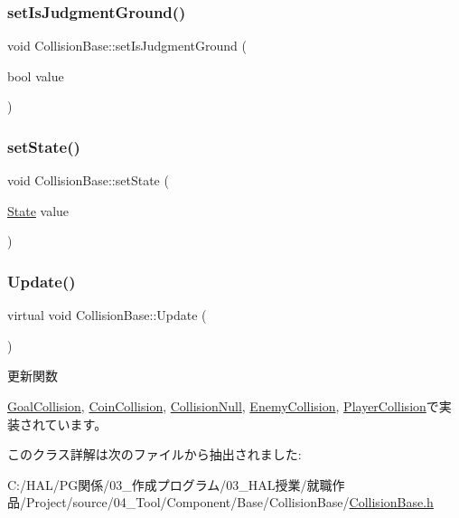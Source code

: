\subsubsection{\texorpdfstring{set\+Is\+Judgment\+Ground()}{setIsJudgmentGround()}}
{\footnotesize\ttfamily void Collision\+Base\+::set\+Is\+Judgment\+Ground (\begin{DoxyParamCaption}\item[{bool}]{value }\end{DoxyParamCaption})\hspace{0.3cm}{\ttfamily [inline]}}

\mbox{\label{class_collision_base_a01db1e666b8e71c33969e9ab6bbc724e}} 
\subsubsection{\texorpdfstring{set\+State()}{setState()}}
{\footnotesize\ttfamily void Collision\+Base\+::set\+State (\begin{DoxyParamCaption}\item[{\mbox{\hyperlink{class_collision_base_a4dd1ed00099a19c0176913af93c4e365}{State}}}]{value }\end{DoxyParamCaption})\hspace{0.3cm}{\ttfamily [inline]}}

\mbox{\label{class_collision_base_a0f967cf5de4178ee99f434c3ff4f16fd}} 
\subsubsection{\texorpdfstring{Update()}{Update()}}
{\footnotesize\ttfamily virtual void Collision\+Base\+::\+Update (\begin{DoxyParamCaption}{ }\end{DoxyParamCaption})\hspace{0.3cm}{\ttfamily [pure virtual]}}



更新関数 



\mbox{\hyperlink{class_goal_collision_a1e3995dc2f5ba2678580d06699ca6936}{Goal\+Collision}}, \mbox{\hyperlink{class_coin_collision_a981fd9b1b8c688a757a456a56d80501b}{Coin\+Collision}}, \mbox{\hyperlink{class_collision_null_a5e5e094e3fbe3ccc0515e485c739bd15}{Collision\+Null}}, \mbox{\hyperlink{class_enemy_collision_ab54133504d867c6d2070d2f3854a0aaf}{Enemy\+Collision}}, \mbox{\hyperlink{class_player_collision_a09f97f220903f5724a3af6b97af3a336}{Player\+Collision}}で実装されています。



このクラス詳解は次のファイルから抽出されました\+:\begin{DoxyCompactItemize}
\item 
C\+:/\+H\+A\+L/\+P\+G関係/03\+\_\+作成プログラム/03\+\_\+\+H\+A\+L授業/就職作品/\+Project/source/04\+\_\+\+Tool/\+Component/\+Base/\+Collision\+Base/\mbox{\hyperlink{_collision_base_8h}{Collision\+Base.\+h}}\end{DoxyCompactItemize}
